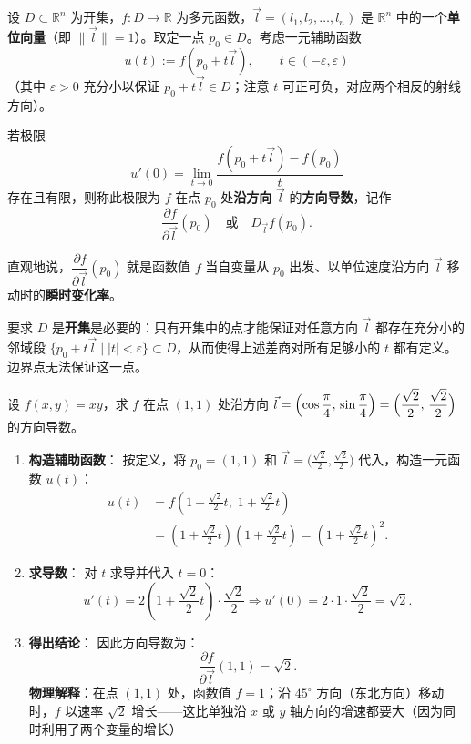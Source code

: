 \documentclass[lang=cn,11pt]{elegantbook}
\begin{document}
\begin{definition} \label{def:directional-derivative}
设 $D\subset\mathbb R^n$ 为开集，$f:D\to\mathbb R$ 为多元函数，$\vec l=(l_1,l_2,\dots,l_n)$ 是 $\mathbb R^n$ 中的一个\textbf{单位向量}（即 $\|\vec l\|=1$）。取定一点 $p_0\in D$。考虑一元辅助函数
\[
u(t):=f(p_0+t\vec l),\qquad t\in(-\varepsilon,\varepsilon)
\]
（其中 $\varepsilon>0$ 充分小以保证 $p_0+t\vec l\in D$；注意 $t$ 可正可负，对应两个相反的射线方向）。

若极限
\[
u'(0)=\lim_{t\to 0}\frac{f(p_0+t\vec l)-f(p_0)}{t}
\]
存在且有限，则称此极限为 $f$ 在点 $p_0$ 处\textbf{沿方向} $\vec l$ 的\textbf{方向导数}，记作
\[
\frac{\partial f}{\partial \vec l}(p_0)\quad\text{或}\quad D_{\vec l}f(p_0).
\]
\end{definition}

直观地说，$\dfrac{\partial f}{\partial \vec l}(p_0)$ 就是函数值 $f$ 当自变量从 $p_0$ 出发、以单位速度沿方向 $\vec l$ 移动时的\textbf{瞬时变化率}。

\begin{note}[关于定义域为开集的要求]
要求 $D$ 是\textbf{开集}是必要的：只有开集中的点才能保证对任意方向 $\vec l$ 都存在充分小的邻域段 $\{p_0+t\vec l\mid|t|<\varepsilon\}\subset D$，从而使得上述差商对所有足够小的 $t$ 都有定义。边界点无法保证这一点。
\end{note}


\begin{exercise}[方向导数的直接计算] \label{ex:dir-deriv-basic}
设 $f(x,y)=xy$，求 $f$ 在点 $(1,1)$ 处沿方向
$\displaystyle\vec l=\Bigl(\cos\frac{\pi}{4},\,\sin\frac{\pi}{4}\Bigr) =\Bigl(\frac{\sqrt2}{2},\,\frac{\sqrt2}{2}\Bigr)$ 的方向导数。
\end{exercise}

\begin{solution}
\begin{enumerate}
  \item \textbf{构造辅助函数}：
  按定义，将 $p_0=(1,1)$ 和 $\vec l=\bigl(\frac{\sqrt2}{2},\frac{\sqrt2}{2}\bigr)$ 代入，构造一元函数 $u(t)$：
  \begin{align*}
  u(t)&=f\!\left(1+\frac{\sqrt2}{2}t,\;1+\frac{\sqrt2}{2}t\right)\\
  &=\left(1+\frac{\sqrt2}{2}t\right)\!\left(1+\frac{\sqrt2}{2}t\right)
   =\left(1+\frac{\sqrt2}{2}t\right)^{\!2}.
  \end{align*}
  
  \item \textbf{求导数}：
  对 $t$ 求导并代入 $t=0$：
  \[
  u'(t)=2\left(1+\frac{\sqrt2}{2}t\right)\cdot\frac{\sqrt2}{2}
  \Longrightarrow
  u'(0)=2\cdot 1\cdot\frac{\sqrt2}{2}=\sqrt2.
  \]
  
  \item \textbf{得出结论}：
  因此方向导数为：
  \[
  \boxed{\frac{\partial f}{\partial\vec l}(1,1)=\sqrt2}.
  \]
  \textbf{物理解释}：在点 $(1,1)$ 处，函数值 $f=1$；沿 $45^\circ$ 方向（东北方向）移动时，$f$ 以速率 $\sqrt2$ 增长——这比单独沿 $x$ 或 $y$ 轴方向的增速都要大（因为同时利用了两个变量的增长）
\end{enumerate}
\end{solution}
\end{document}

